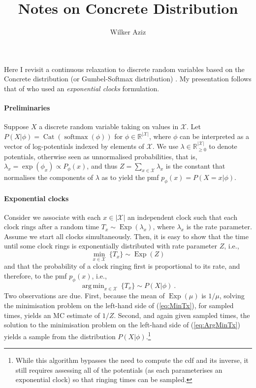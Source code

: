 \documentclass[11pt]{article}
\title{Notes on Concrete Distribution}
\author{Wilker Aziz}
\DeclareMathOperator*{\argmin}{arg\,min}
\DeclareMathOperator*{\Cat}{Cat}
\DeclareMathOperator*{\Exp}{Exp}
\DeclareMathOperator*{\softmax}{softmax}
\begin{document}
\maketitle



Here I revisit a continuous relaxation to discrete random variables based on the Concrete distribution (or Gumbel-Softmax distribution)  \citep{MaddisonEtAl2017:Concrete,JangEtAl2017:GumbelSoftmax}. 
My presentation follows that of \citet{BalogEtAl2017:Gumbel} who used an \emph{exponential clocks}  \citep{BuchbinderEtAl2013} formulation.


\paragraph{Preliminaries} Suppose $X$ a discrete random variable taking on values in $\mathcal X$. Let 
$P(X|\phi) = \Cat(\softmax(\phi))$ for $\phi \in \mathbb R^{|\mathcal X|}$, where $\phi$ can be interpreted as a vector of log-potentials indexed by elements of $\mathcal X$. 
We use $\lambda \in \mathbb R^{|\mathcal X|}_{\ge 0}$ to denote potentials, otherwise seen as unnormalised probabilities, that is, $\lambda_x = \exp(\phi_x) \propto P_\phi(x)$, and  thus $Z = \sum_{x \in \mathcal X} \lambda_x$ is the constant that normalises the components of $\lambda$ as to yield the pmf $p_\phi(x) = P(X=x|\phi)$.


\paragraph{Exponential clocks} Consider we associate with each $x \in |\mathcal X|$ an independent clock such that each clock rings after a random time $T_x \sim \Exp(\lambda_x)$, where $\lambda_x$ is the rate parameter. 
Assume we start all clocks simultaneously. Then, it is easy to show that the time until some clock rings is exponentially distributed with rate parameter $Z$, i.e., 
\begin{equation}\label{eq:MinTx}
	\min_{x \in \mathcal X} ~ \{T_x\} \sim \Exp(Z) 
\end{equation}
and that the probability of a clock ringing first is proportional to its rate, and therefore, to the pmf $p_\phi(x)$, i.e.,
\begin{equation}\label{eq:ArgMinTx}
	\argmin_{x \in \mathcal X} ~ \{T_x\} \sim P(X|\phi) ~.
\end{equation}
Two observations are due. First, because the mean of $\Exp(\mu)$ is $1/\mu$, solving the minimisation problem on the left-hand side of (\ref{eq:MinTx}), for sampled times, yields an MC estimate of $1/Z$.
Second, and again given sampled times, the solution to the minimisation problem on the left-hand side of (\ref{eq:ArgMinTx}) yields a sample from the distribution $P(X|\phi)$.\footnote{While this algorithm bypasses the need to compute the cdf and its inverse, it still requires assessing all of the potentials (as each parameterises an exponential clock) so that ringing times can be sampled.}
\end{document}
